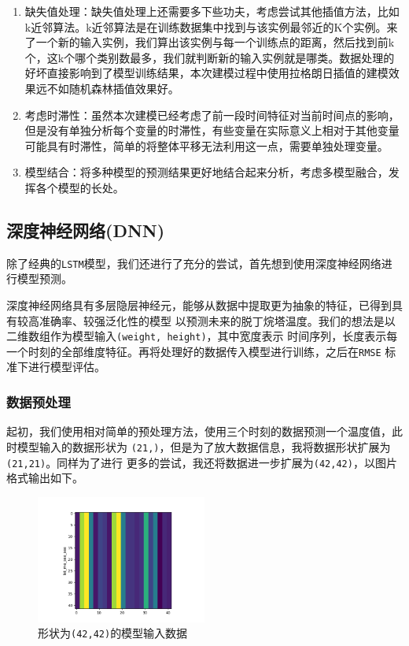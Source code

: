 \documentclass[11pt,a4paper]{elegantpaper}
\begin{document}
\begin{multicols}{2}
\begin{enumerate}
  \item 缺失值处理：缺失值处理上还需要多下些功夫，考虑尝试其他插值方法，比如k近邻算法。k近邻算法是在训练数据集中找到与该实例最邻近的K个实例。来了一个新的输入实例，我们算出该实例与每一个训练点的距离，然后找到前k个，这k个哪个类别数最多，我们就判断新的输入实例就是哪类。数据处理的好坏直接影响到了模型训练结果，本次建模过程中使用拉格朗日插值的建模效果远不如随机森林插值效果好。
  \item 考虑时滞性：虽然本次建模已经考虑了前一段时间特征对当前时间点的影响，但是没有单独分析每个变量的时滞性，有些变量在实际意义上相对于其他变量可能具有时滞性，简单的将整体平移无法利用这一点，需要单独处理变量。
  \item 模型结合：将多种模型的预测结果更好地结合起来分析，考虑多模型融合，发挥各个模型的长处。
\end{enumerate}

\subsection{深度神经网络(DNN)}

除了经典的\lstinline{LSTM}模型，我们还进行了充分的尝试，首先想到使用深度神经网络进行模型预测。

深度神经网络具有多层隐层神经元，能够从数据中提取更为抽象的特征，已得到具有较高准确率、较强泛化性的模型
以预测未来的脱丁烷塔温度。我们的想法是以二维数组作为模型输入\lstinline{(weight, height)}，其中宽度表示
时间序列，长度表示每一个时刻的全部维度特征。再将处理好的数据传入模型进行训练，之后在\lstinline{RMSE}
标准下进行模型评估。

\subsubsection{数据预处理}

起初，我们使用相对简单的预处理方法，使用三个时刻的数据预测一个温度值，此时模型输入的数据形状为
\lstinline{(21,)}，但是为了放大数据信息，我将数据形状扩展为\lstinline{(21,21)}。同样为了进行
更多的尝试，我还将数据进一步扩展为\lstinline{(42,42)}，以图片格式输出如下。

\begin{figure}[H]
  \centering
  \includegraphics[width=0.5\textwidth]{images/4242.png}
  \caption{形状为\lstinline{(42,42)}的模型输入数据} 
\end{figure}


\end{multicols}
\end{document}
